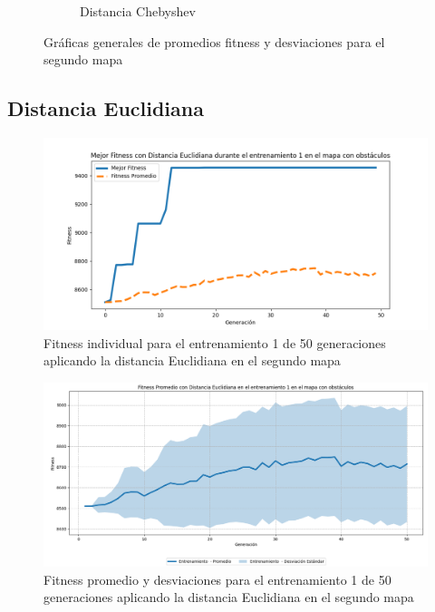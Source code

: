 \documentclass[lettersize, journal]{IEEEtran}
\begin{document}
\begin{figure}[ht]
\begin{subfigure}{0.3\textwidth}
        \caption{Distancia Chebyshev}
        \label{fig:chebyshev_mapa2}
    \end{subfigure}
    \caption{Gráficas generales de promedios fitness y desviaciones para el segundo mapa}
    \label{fig:graficas_generales_mapa2}

\end{figure}

\subsection{Distancia Euclidiana}
\begin{figure}[H]
    \centering
    \includegraphics[width=0.9 \linewidth]{Euclidiana/Mapa2/Fitness_1_Map2_Eucli_50Gen.png}
    \caption{Fitness individual para el entrenamiento 1 de 50 generaciones aplicando la distancia Euclidiana en el segundo mapa}
    \label{fig:eucli_1_50_m2}
\end{figure}
\begin{figure}[H]
    \centering
    \includegraphics[width=0.9 \linewidth]{Euclidiana/Mapa2/Fitness_1_Map2_Eucli_50Gen_Sombra.png}
    \caption{Fitness promedio y desviaciones para el entrenamiento 1 de 50 generaciones aplicando la distancia Euclidiana en el segundo mapa}
    \label{fig:eucli_1_50_sombra_m2}
\end{figure}
\end{document}
